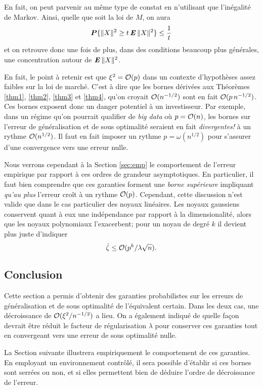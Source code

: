 En fait, on peut parvenir au même type de constat en n'utilisant que l'inégalité de
Markov. Ainsi, quelle que soit la loi de $M$, on aura
\begin{equation}
  \bm P\{\|X\|^2 \ge t\operatorname{\mbox{\textbf{\textit{E}}}}\|X\|^2\} \leq \frac{1}{t}
\end{equation}
et on retrouve donc une fois de plus, dans des conditions beaucoup plus générales, une
concentration autour de $\operatorname{\mbox{\textbf{\textit{E}}}}\|X\|^2$. 

En fait, le point à retenir est que $\xi^2 = \mathcal O(p)$ dans un contexte d'hypothèses assez
faibles sur la loi de marché. C'est à dire que les bornes dérivées aux Théorèmes
\ref{thm1}, \ref{thm2}, \ref{thm3} et \ref{thm4}, qu'on croyait
$\mathcal O(n^{-1/2})$ sont en fait $\mathcal O(p\,n^{-1/2})$. Ces bornes exposent donc un
danger potentiel à un investisseur. Par exemple, dans un régime qu'on pourrait qualifier
de \textit{big data} où $p=\mathcal O(n)$, les bornes sur l'erreur de généralisation et de sous
optimalité seraient en fait \textit{divergentes!} à un rythme $\mathcal O(n^{1/2})$. Il faut en
fait imposer un rythme $p = \omega(n^{1/2})$ pour s'assurer d'une convergence vers une erreur
nulle.

Nous verrons cependant à la Section \ref{sec:emp} le comportement de l'erreur empirique
par rapport à ces ordres de grandeur asymptotiques. En particulier, il faut bien
comprendre que ces garanties forment une \textit{borne supérieure} impliquant \textit{qu'au plus}
l'erreur croît à un rythme $\mathcal O(p)$. 
Cependant, cette discussion n'est valide que dans le cas particulier des noyaux
linéaires. Les noyaux gaussiens conservent quant à eux une indépendance par rapport à la
dimensionalité, alors que les noyaux polynomiaux l'exacerbent; pour un noyau de degré $k$
il devient plus juste d'indiquer
\begin{equation}
  \hat\zeta \leq \mathcal O(p^k/\lambda\sqrt{n}).
\end{equation}

\subsection{Conclusion}

Cette section a permis d'obtenir des garanties probabilistes sur les erreurs de
généralisation et de sous optimalité de l'équivalent certain. Dans les deux cas, une
décroissance de $\mathcal O(\xi^2/n^{-1/2})$ a lieu. On a également indiqué de quelle façon
devrait être réduit le facteur de régularisation $\lambda$ pour conserver ces garanties tout en
convergeant vers une erreur de sous optimalité nulle.

La Section suivante illustrera empiriquement le comportement de ces garanties. En
employant un environnement contrôlé, il sera possible d'établir si ces bornes sont serrées
ou non, et si elles permettent bien de déduire l'ordre de décroissance de l'erreur. 






